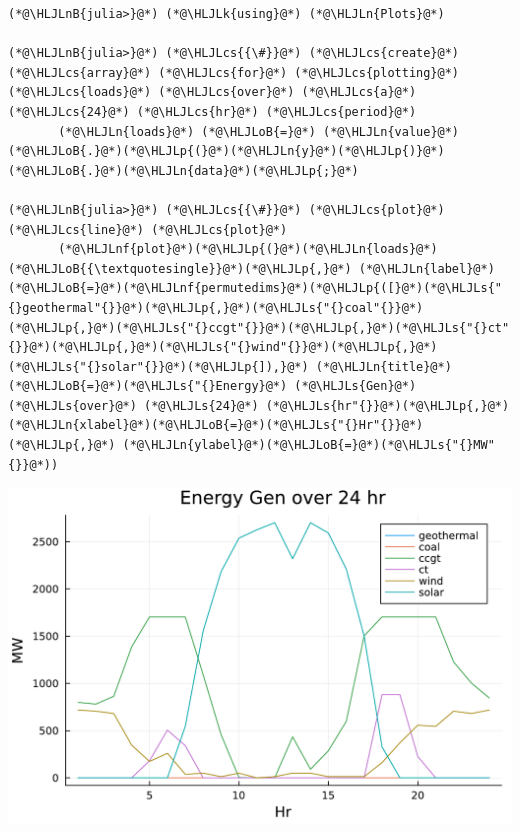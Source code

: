 \documentclass[12pt,a4paper]{article}
\newcommand{\HLJLk}[1]{\textcolor[RGB]{148,91,176}{\textbf{#1}}}
\newcommand{\HLJLn}[1]{#1}
\newcommand{\HLJLnf}[1]{\textcolor[RGB]{66,102,213}{#1}}
\newcommand{\HLJLs}[1]{\textcolor[RGB]{201,61,57}{#1}}
\newcommand{\HLJLnB}[1]{\textcolor[RGB]{59,151,46}{#1}}
\newcommand{\HLJLoB}[1]{\textcolor[RGB]{102,102,102}{\textbf{#1}}}
\newcommand{\HLJLp}[1]{#1}
\newcommand{\HLJLcs}[1]{\textcolor[RGB]{153,153,119}{\textit{#1}}}
\begin{document}
\begin{lstlisting}
(*@\HLJLnB{julia>}@*) (*@\HLJLk{using}@*) (*@\HLJLn{Plots}@*)

(*@\HLJLnB{julia>}@*) (*@\HLJLcs{{\#}}@*) (*@\HLJLcs{create}@*) (*@\HLJLcs{array}@*) (*@\HLJLcs{for}@*) (*@\HLJLcs{plotting}@*) (*@\HLJLcs{loads}@*) (*@\HLJLcs{over}@*) (*@\HLJLcs{a}@*) (*@\HLJLcs{24}@*) (*@\HLJLcs{hr}@*) (*@\HLJLcs{period}@*)
       (*@\HLJLn{loads}@*) (*@\HLJLoB{=}@*) (*@\HLJLn{value}@*)(*@\HLJLoB{.}@*)(*@\HLJLp{(}@*)(*@\HLJLn{y}@*)(*@\HLJLp{)}@*)(*@\HLJLoB{.}@*)(*@\HLJLn{data}@*)(*@\HLJLp{;}@*)

(*@\HLJLnB{julia>}@*) (*@\HLJLcs{{\#}}@*) (*@\HLJLcs{plot}@*) (*@\HLJLcs{line}@*) (*@\HLJLcs{plot}@*)
       (*@\HLJLnf{plot}@*)(*@\HLJLp{(}@*)(*@\HLJLn{loads}@*)(*@\HLJLoB{{\textquotesingle}}@*)(*@\HLJLp{,}@*) (*@\HLJLn{label}@*)(*@\HLJLoB{=}@*)(*@\HLJLnf{permutedims}@*)(*@\HLJLp{([}@*)(*@\HLJLs{"{}geothermal"{}}@*)(*@\HLJLp{,}@*)(*@\HLJLs{"{}coal"{}}@*)(*@\HLJLp{,}@*)(*@\HLJLs{"{}ccgt"{}}@*)(*@\HLJLp{,}@*)(*@\HLJLs{"{}ct"{}}@*)(*@\HLJLp{,}@*)(*@\HLJLs{"{}wind"{}}@*)(*@\HLJLp{,}@*)(*@\HLJLs{"{}solar"{}}@*)(*@\HLJLp{]),}@*) (*@\HLJLn{title}@*)(*@\HLJLoB{=}@*)(*@\HLJLs{"{}Energy}@*) (*@\HLJLs{Gen}@*) (*@\HLJLs{over}@*) (*@\HLJLs{24}@*) (*@\HLJLs{hr"{}}@*)(*@\HLJLp{,}@*) (*@\HLJLn{xlabel}@*)(*@\HLJLoB{=}@*)(*@\HLJLs{"{}Hr"{}}@*)(*@\HLJLp{,}@*) (*@\HLJLn{ylabel}@*)(*@\HLJLoB{=}@*)(*@\HLJLs{"{}MW"{}}@*))
\end{lstlisting}
\includegraphics[width=\linewidth]{figures/solution-template_6_1.pdf}
\end{document}
